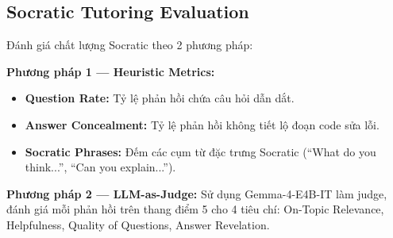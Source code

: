 \subsection{Socratic Tutoring Evaluation}

Đánh giá chất lượng Socratic theo 2 phương pháp:

\textbf{Phương pháp 1 --- Heuristic Metrics:}
\begin{itemize}
    \item \textbf{Question Rate:} Tỷ lệ phản hồi chứa câu hỏi dẫn dắt.
    \item \textbf{Answer Concealment:} Tỷ lệ phản hồi không tiết lộ đoạn code sửa lỗi.
    \item \textbf{Socratic Phrases:} Đếm các cụm từ đặc trưng Socratic (``What do you think...'', ``Can you explain...'').
\end{itemize}

\textbf{Phương pháp 2 --- LLM-as-Judge:}
Sử dụng Gemma-4-E4B-IT làm judge, đánh giá mỗi phản hồi trên thang điểm 5 cho 4 tiêu chí: On-Topic Relevance, Helpfulness, Quality of Questions, Answer Revelation.
